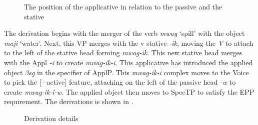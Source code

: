 \documentclass[output=paper]{langscibook}
\begin{document}
\begin{figure}
\caption{\label{fig:rmtree2}The position of the applicative in relation to the passive and the stative} 
\end{figure}

The derivation begins with the merger of the verb \textit{mwag} `spill' with the object \textit{maji} `water'. Next, this VP merges with the v stative \textit{-ik}, moving the \textit{V} to attach to the left of the stative head forming \textit{mwag-ik}. This new stative head merges with the Appl \textit{-i} to create \textit{mwag-ik-i}. This applicative has introduced the applied object \textit{3sg} in the specifier of ApplP. This \textit{mwag-ik-i} complex moves to the Voice to pick the [−active] feature, attaching on the left of the passive head \textit{-w} to create \textit{mwag-ik-i-w}. The applied object then moves to SpecTP to satisfy the EPP requirement. The derivations is shown in .

\begin{figure}
\caption{\label{fig:rmtree3}Derivation details}
\end{figure}
\end{document}
